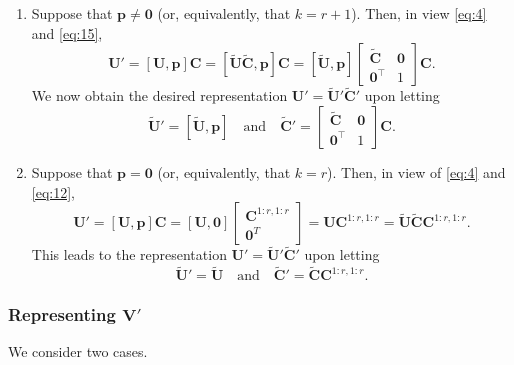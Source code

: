 \documentclass[11pt,a4paper]{article}
\theoremstyle{mybreak}
\numberwithin{dummy}{section}
\theoremstyle{plain}
\theoremstyle{plain}
\theoremstyle{plain}
\theoremstyle{plain}
\theoremstyle{MyNonumberplain}
\newcommand{\0}{\M{0}}
\newcommand{\M}[1]{\mathbf{#1}}
\newcommand{\Mt}[1]{\tilde{\M{#1}}}
\newcommand{\T}{\top}
\newcommand{\ve}[1]{\mathbf{#1}}
\begin{document}
\begin{enumerate}[font=\upshape,label=(\roman*),wide,align=right]
\item Suppose that $\ve{p} \neq \0$ (or, equivalently, that $k= r + 1$). Then, in view \eqref{eq:4} and \eqref{eq:15},
\begin{displaymath}
  \M{U}' = [\M{U}, \ve{p}] \M{C} = [\Mt{U} \Mt{C}, \ve{p}] \M{C}
  =
  [\Mt{U}, \ve{p}]
  \begin{bmatrix}
    \Mt{C} & \0
    \\
    \0^\T & 1
  \end{bmatrix}
  \M{C}.
\end{displaymath}
We now obtain the desired representation 
\begin{math}
  \M{U}' = \Mt{U}' \Mt{C}'
\end{math}
upon letting
\begin{displaymath}
  \Mt{U}' = [\Mt{U}, \ve{p}]
  \quad
  \text{and}
  \quad
  \Mt{C}' =
  \begin{bmatrix}
    \Mt{C} & \0
    \\
    \0^\T & 1
  \end{bmatrix}
  \M{C}.
\end{displaymath}
\item Suppose that $\ve{p} = \0$ (or, equivalently, that $k = r$). Then, in view of \eqref{eq:4} and \eqref{eq:12},
\begin{displaymath}
  \M{U}' = [\M{U}, \ve{p}] \M{C}
  = [\M{U}, \0]
  \begin{bmatrix}
    \M{C}^{1:r, 1:r}
    \\
    \0^T
  \end{bmatrix}
  = \M{U} \M{C}^{1:r, 1:r}
  = \Mt{U} \Mt{C}  \M{C}^{1:r, 1:r}.
\end{displaymath}
This leads to the representation
\begin{math}
  \M{U}' = \Mt{U}' \Mt{C}'
\end{math}
upon letting
\begin{displaymath}
  \Mt{U}' =  \Mt{U}
  \quad
  \text{and}
  \quad
  \Mt{C}' = \Mt{C}  \M{C}^{1:r, 1:r}.
\end{displaymath}
\end{enumerate}

\subsubsection{Representing $\M{V}'$}

We consider two cases.
\end{document}
